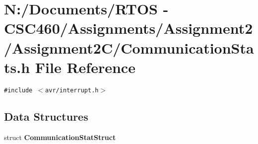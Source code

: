 \section{N:/Documents/RTOS - CSC460/Assignments/Assignment2/Assignment2C/Communication\-Stats.h File Reference}
\label{_communication_stats_8h}
{\tt \#include $<$avr/interrupt.h$>$}\par
\subsection*{Data Structures}
\begin{CompactItemize}
\item 
struct {\bf Communication\-Stat\-Struct}
\end{CompactItemize}
